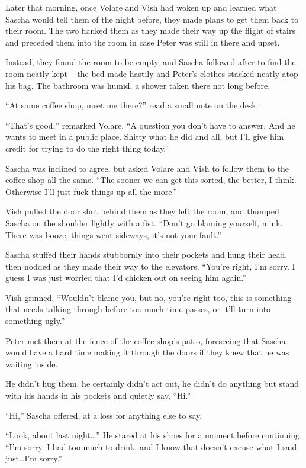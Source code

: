 \secdiv

Later that morning, once Volare and Vish had woken up and learned what Sascha would tell them of the night before, they made plans to get them back to their room. The two flanked them as they made their way up the flight of stairs and preceded them into the room in case Peter was still in there and upset.

Instead, they found the room to be empty, and Sascha followed after to find the room neatly kept -- the bed made hastily and Peter's clothes stacked neatly atop his bag. The bathroom was humid, a shower taken there not long before.

``At same coffee shop, meet me there?'' read a small note on the desk.

``That's good,'' remarked Volare. ``A question you don't have to answer. And he wants to meet in a public place. Shitty what he did and all, but I'll give him credit for trying to do the right thing today.''

Sascha was inclined to agree, but asked Volare and Vish to follow them to the coffee shop all the same. ``The sooner we can get this sorted, the better, I think. Otherwise I'll just fuck things up all the more.''

Vish pulled the door shut behind them as they left the room, and thumped Sascha on the shoulder lightly with a fist. ``Don't go blaming yourself, mink. There was booze, things went sideways, it's not your fault.''

Sascha stuffed their hands stubbornly into their pockets and hung their head, then nodded as they made their way to the elevators. ``You're right, I'm sorry. I guess I was just worried that I'd chicken out on seeing him again.''

Vish grinned, ``Wouldn't blame you, but no, you're right too, this is something that needs talking through before too much time passes, or it'll turn into something ugly.''

\secdiv

Peter met them at the fence of the coffee shop's patio, foreseeing that Sascha would have a hard time making it through the doors if they knew that he was waiting inside.

He didn't hug them, he certainly didn't act out, he didn't do anything but stand with his hands in his pockets and quietly say, ``Hi.''

``Hi,'' Sascha offered, at a loss for anything else to say.

``Look, about last night\ldots{}'' He stared at his shoes for a moment before continuing, ``I'm sorry. I had too much to drink, and I know that doesn't excuse what I said, just\ldots{}I'm sorry.''

